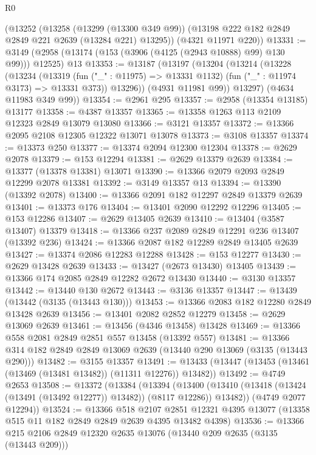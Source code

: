 \begin{lexlean}{R0}
\begin{coremodule}
    (@13252
      (@13258
        (@13299 (@13300 @349 @99))
        (@13198 @222 @182 @2849 @2849 @221 @2639 (@13284 @221) @13295))
      (@4321 @11971 @220))
@13331 := @3149 (@2958 (@13174 (@153 (@3906 (@4125 (@2943 @10888) @99) @130 @99))) @12525) @13
@13353 := @13187
    (@13197
      (@13204
        (@13214
          (@13228
            (@13234
              (@13319
                (fun ("_" : @11975) => @13331 @1132)
                (fun ("_" : @11974 @3173) => @13331 @373))
              @13296))
          (@4931 @11981 @99))
        @13297)
      (@4634 @11983 @349 @99))
@13354 := @2961 @295
@13357 := @2958 (@13354 @13185) @13177
@13358 := @4387 @13357
@13365 := @13358 @1263 @113 @2109 @12323 @2849 @13079 @13080
@13366 := @3121 @13357
@13372 := @13366 @2095 @2108 @12305 @12322 @13071 @13078
@13373 := @3108 @13357
@13374 := @13373 @250
@13377 := @13374 @2094 @12300 @12304
@13378 := @2629 @2078
@13379 := @153 @12294
@13381 := @2629 @13379 @2639
@13384 := @13377 (@13378 @13381) @13071
@13390 := @13366 @2079 @2093 @2849 @12299 @2078 @13381
@13392 := @3149 @13357 @13
@13394 := @13390 (@13392 @2078)
@13400 := @13366 @2091 @182 @12297 @2849 @13379 @2639
@13401 := @13373 @176
@13404 := @13401 @2090 @12292 @12296
@13405 := @153 @12286
@13407 := @2629 @13405 @2639
@13410 := @13404 (@3587 @13407) @13379
@13418 := @13366 @237 @2089 @2849 @12291 @236 @13407 (@13392 @236)
@13424 := @13366 @2087 @182 @12289 @2849 @13405 @2639
@13427 := @13374 @2086 @12283 @12288
@13428 := @153 @12277
@13430 := @2629 @13428 @2639
@13433 := @13427 (@2673 @13430) @13405
@13439 := @13366 @174 @2085 @2849 @12282 @2672 @13430
@13440 := @3130 @13357
@13442 := @13440 @130 @2672
@13443 := @3136 @13357
@13447 := @13439 (@13442 (@3135 (@13443 @130)))
@13453 := @13366 @2083 @182 @12280 @2849 @13428 @2639
@13456 := @13401 @2082 @2852 @12279
@13458 := @2629 @13069 @2639
@13461 := @13456 (@4346 @13458) @13428
@13469 := @13366 @558 @2081 @2849 @2851 @557 @13458 (@13392 @557)
@13481 := @13366 @314 @182 @2849 @2849 @13069 @2639 (@13440 @290 @13069 (@3135 (@13443 @290)))
@13482 := @3155 @13357
@13491 := @13433 (@13447 (@13453 (@13461 (@13469 (@13481 @13482)) (@11311 @12276)) @13482))
@13492 := @4749 @2653
@13508 := @13372
    (@13384
      (@13394
        (@13400 (@13410 (@13418 (@13424 (@13491 (@13492 @12277)) @13482)) (@8117 @12286)) @13482))
      (@4749 @2077 @12294))
@13524 := @13366
    @518
    @2107
    @2851
    @12321
    @4395
    @13077
    (@13358 @515 @11 @182 @2849 @2849 @2639 @4395 @13482 @4398)
@13536 := @13366 @215 @2106 @2849 @12320 @2635 @13076 (@13440 @209 @2635 (@3135 (@13443 @209)))

\end{coremodule}
\end{lexlean}
